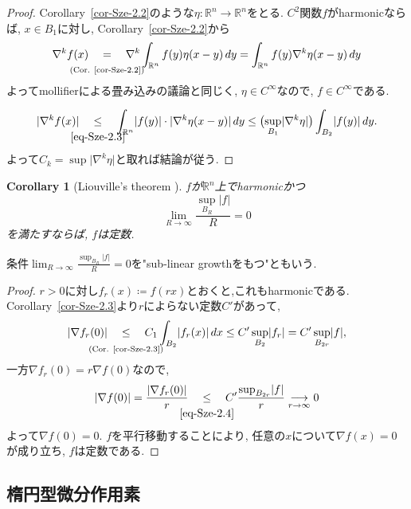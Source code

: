 \documentclass[dvipdfmx,a4paper,11pt]{article} %
\newtheorem{cor}[thm]{Corollary}
\theoremstyle{definition}
\theoremstyle{remark}
\numberwithin{equation}{section}
\newcommand{\underalign}[2]{%
  \quad
  \underset{\mathclap{\raisebox{-1.6ex}{\ensuremath{\scriptstyle #1}}}}{#2}
  \quad
}
\newcommand{\R}{\mathbb{R}}
\begin{document}
\begin{proof}
Corollary~\ref{cor-Sze-2.2}のような$\eta \colon \R^n \to \R^n$をとる. 
$C^2$関数$f$がharmonicならば, 
 $x\in B_1$に対し, Corollary~\ref{cor-Sze-2.2}から
 \begin{equation}
\label{eq-Sze-2.3}
\nabla^k f(x)
\underalign{\text{(Cor. \ref{cor-Sze-2.2})}}{=}
\nabla^k \int_{\mathbb{R}^n} f(y)\eta(x-y)\,dy
=
\int_{\mathbb{R}^n} f(y)\nabla^k\eta(x-y)\,dy
\end{equation}
よってmollifierによる畳み込みの議論と同じく, $\eta \in C^{\infty}$なので, $f \in C^\infty$である. 

\[
\lvert\nabla^k f(x)\rvert
\underalign{\eqref{eq-Sze-2.3}}{\leq}
\int_{\mathbb{R}^n} \lvert f(y)\rvert \cdot \lvert\nabla^k\eta(x-y)\rvert\,dy
\leq\bigl(\sup_{B_1}\lvert\nabla^k\eta\rvert\bigr)\int_{B_2}\lvert f(y)\rvert\,dy.
\]
よって$C_k=\sup\lvert\nabla^k\eta\rvert$と取れば結論が従う.
\end{proof}


\begin{cor}
[Liouville's theorem {\cite[Corollary 2.4]{Sze14}}]
\label{cor-Sze-2.4}
 $f$が$\mathbb{R}^n$上でharmonicかつ
 \[
\lim_{R\to\infty} \frac{\sup_{B_R}\lvert f\rvert}{R}=0
\]
を満たすならば, $f$は定数. 
\end{cor}
条件$\lim_{R\to\infty} \frac{\sup_{B_R}\lvert f\rvert}{R}=0$を"sub-linear growthをもつ"ともいう. 

\begin{proof}

$r>0$に対し$f_r(x) \coloneqq f(rx)$とおくと,これもharmonicである. 
Corollary~\ref{cor-Sze-2.3}より$r$によらない定数$C'$があって, 
\begin{equation}
\label{eq-Sze-2.4}
\lvert\nabla f_r(0)\rvert
\underalign{\text{(Cor. \ref{cor-Sze-2.3})}}{ \leq }
C_1\int_{B_2} \lvert f_r(x)\rvert\,dx \leq C'\sup_{B_2}\lvert f_r\rvert=C'\sup_{B_{2r}}\lvert f\rvert,
\end{equation}
一方$\nabla f_r(0)=r\nabla f(0)$なので,
\[
\lvert\nabla f(0)\rvert
=\frac{\lvert\nabla f_r(0)\rvert}{r}
\underalign{\eqref{eq-Sze-2.4}}{\leq} C' \frac{\sup_{B_{2r}}\lvert f\rvert}{r}  \underset{r \to \infty}{\longrightarrow} 0
\]
よって$\nabla f(0)=0$. $f$を平行移動することにより, 任意の$x$について$\nabla f(x)=0$が成り立ち, $f$は定数である. 
\end{proof}

\subsection{楕円型微分作用素}
\end{document}
